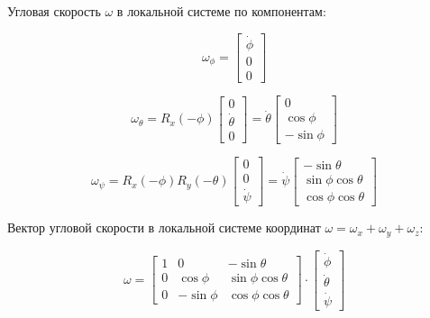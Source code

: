 Угловая скорость \(\omega\) в локальной системе по компонентам:

\begin{equation}
\omega_{\phi}=
\begin{bmatrix}
    \dot{\phi} \\
    0 \\
    0
\end{bmatrix}
\end{equation}

\begin{equation}
\omega_{\theta}=
R_x({-\phi}) \begin{bmatrix}
    0 \\
    \dot{\theta} \\
    0
    \end{bmatrix}=
    \dot{\theta}
    \begin{bmatrix}
        0 \\
        \cos \phi \\
        -\sin \phi
    \end{bmatrix}
\end{equation}

\begin{equation}
\omega_{\psi}=
R_x({-\phi}) R_y({-\theta}) \begin{bmatrix}
    0 \\
    0 \\
    \dot{\psi}
    \end{bmatrix}=
    \dot{\psi}
    \begin{bmatrix}
        -\sin \theta \\
        \sin \phi \cos \theta \\
        \cos \phi \cos \theta
    \end{bmatrix}
\end{equation}


Вектор угловой скорости в локальной системе координат \(\omega=\omega_x+\omega_y+\omega_z\):

\begin{equation}
\omega=
\begin{bmatrix}
    1 & 0 & -\sin\theta \\
    0 & \cos\phi & \sin\phi\cos\theta \\
    0 &  -\sin\phi & \cos\phi\cos\theta
\end{bmatrix}
\cdot
\begin{bmatrix}
    \dot{\phi} \\
    \dot{\theta} \\
    \dot{\psi}
\end{bmatrix}
\end{equation}


